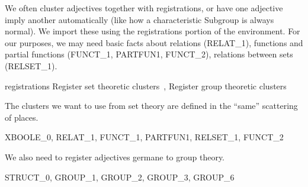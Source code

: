 We often cluster adjectives together with registrations, or have one
adjective imply another automatically (like how a characteristic
Subgroup is always normal). We import these using the registrations
portion of the environment. For our purposes, we may need basic facts
about relations ({\Tt{}RELAT{\_}1\nwendquote}), functions and partial functions ({\Tt{}FUNCT{\_}1\nwendquote},
{\Tt{}PARTFUN1\nwendquote}, {\Tt{}FUNCT{\_}2\nwendquote}), relations between sets ({\Tt{}RELSET{\_}1\nwendquote}).

\nwenddocs{}\endmoddef\nwstartdeflinemarkup{}\nwenddeflinemarkup
registrations \LA{}Register set theoretic clusters~{\nwtagstyle{}}\RA{},
  \LA{}Register group theoretic clusters~{\nwtagstyle{}}\RA{}

\nwendcode{}\nwdocspar

\M
The clusters we want to use from set theory are defined in the ``same''
scattering of places.

\nwenddocs{}\endmoddef\nwstartdeflinemarkup{}\nwenddeflinemarkup
XBOOLE_0, RELAT_1, FUNCT_1, PARTFUN1, RELSET_1, FUNCT_2

\nwendcode{}\nwdocspar

\M
We also need to register adjectives germane to group theory.

\nwenddocs{}\endmoddef\nwstartdeflinemarkup{}\nwenddeflinemarkup
STRUCT_0, GROUP_1, GROUP_2, GROUP_3, GROUP_6

\nwendcode{}\nwdocspar

